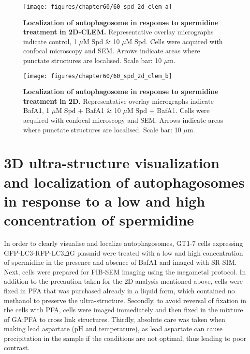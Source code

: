 \begin{landscape}
\begin{figure}[!htbp]
\center
  \texttt{[image: figures/chapter60/60\_spd\_2d\_clem\_a]}
  \caption[Localization of autophagosome in response to spermidine treatment in 2D-CLEM]{\textbf{Localization of autophagosome in response to spermidine treatment in 2D-CLEM.} Representative overlay micrographs indicate control, 1 $\mu$M Spd \& 10 $\mu$M Spd. Cells were acquired with confocal microscopy and SEM. Arrows indicate areas where punctate structures are localised. Scale bar: 10 $\mu$m.}
  \label{fig:60_spd_2d_clem_a}
\end{figure} 
\end{landscape}

\begin{landscape}
\begin{figure}[!htbp]
\centering
  \texttt{[image: figures/chapter60/60\_spd\_2d\_clem\_b]}
  \caption[Localization of autophagosome in response to spermidine treatment in 2D]{\textbf{Localization of autophagosome in response to spermidine treatment in 2D.} Representative overlay micrographs indicate BafA1, 1 $\mu$M Spd + BafA1 \& 10 $\mu$M Spd + BafA1. Cells were acquired with confocal microscopy and SEM. Arrows indicate areas where punctate structures are localised. Scale bar: 10 $\mu$m.}
  \label{fig:60_spd_2d_clem_b}
\end{figure} 
\end{landscape}

\section{3D ultra-structure visualization and localization of autophagosomes  in response to a low and high concentration of spermidine}
In order to clearly visualise and localize autophagosomes, GT1-7 cells expressing GFP-LC3-RFP-LC3$\Delta$G plasmid were treated with a low and high concentration of spermidine in the presence and absence of BafA1 and imaged with SR-SIM. Next, cells were prepared for FIB-SEM imaging using the megametal protocol. In addition to the precaution taken for the 2D analysis mentioned above, cells were fixed in PFA that was purchased already in a liquid form, which contained no methanol to preserve the ultra-structure. Secondly, to avoid reversal of fixation in the cells with PFA, cells were imaged immediately and then fixed in the mixture of GA:PFA to cross link structures. Thirdly, absolute care was taken when making lead aspartate (pH and temperature), as lead aspartate can cause precipitation in the sample if the conditions are not optimal, thus leading to poor contrast.

